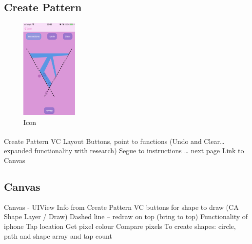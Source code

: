 \documentclass[11pt]{article}
\begin{document}
            \subsection{Create Pattern}
             \begin{figure}
                        \centering
                        \includegraphics[width=0.25\textwidth]{KiriZen/createPattern.png}
                        \caption{Icon}
                        \label{fig:kiriZen-createPattern}
                    \end{figure}
                    
                \paragraph{} 
                Create Pattern VC
                Layout Buttons, point to functions (Undo and Clear… expanded functionality with research)
                Segue to instructions … next page
                Link to Canvas


            \subsection{Canvas}
            
            Canvas - UIView
            Info from Create Pattern VC buttons for shape to draw (CA Shape Layer / Draw)
            Dashed line – redraw on top (bring to top)
            Functionality of iphone
            Tap location
            Get pixel colour
            Compare pixels
            To create shapes: circle, path and shape array and tap count
            
            

            \paragraph{} 
      
\end{document}
